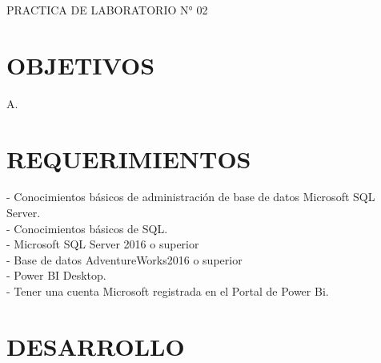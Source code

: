 \begin{center}
    PRACTICA DE LABORATORIO N° 02
\end{center}

\section{OBJETIVOS}
A.

\section{REQUERIMIENTOS}

\begin{itemize}

- Conocimientos básicos de administración de base de datos Microsoft   SQL Server.
\\- Conocimientos básicos de SQL.
\\- Microsoft SQL Server 2016 o superior
\\- Base de datos AdventureWorks2016 o superior
\\- Power BI Desktop.
\\- Tener una cuenta Microsoft registrada en el Portal de Power Bi.
\end{itemize}

\section{DESARROLLO} 


